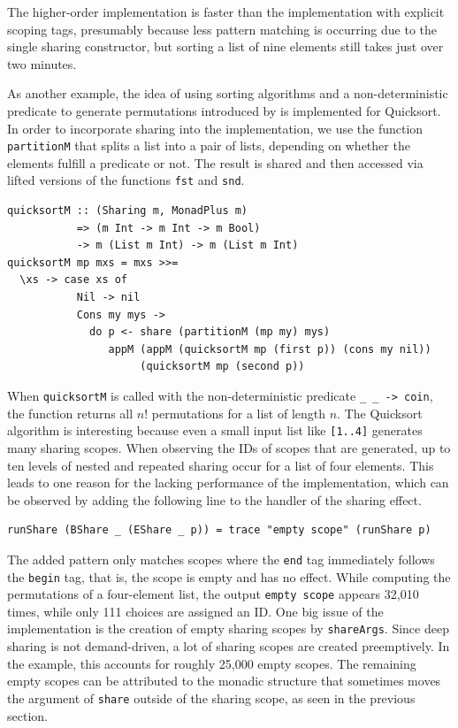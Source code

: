 \documentclass[a4paper, 11pt, fleqn, twoside, abstract=on]{scrreprt}
\newcommand{\hinl}[1]{\texttt{#1}}
\begin{document}
The higher-order implementation is faster than the implementation with explicit scoping tags, presumably because less pattern matching is occurring due to the single sharing constructor, but sorting a list of nine elements still takes just over two minutes.

As another example, the idea of using sorting algorithms and a non-deterministic predicate to generate permutations introduced by \citet{Christiansen2016allsorts} is implemented for Quicksort.
In order to incorporate sharing into the implementation, we use the function \hinl{partitionM} that splits a list into a pair of lists, depending on whether the elements fulfill a predicate or not.
The result is shared and then accessed via lifted versions of the functions \hinl{fst} and \hinl{snd}.

\begin{verbatim}
quicksortM :: (Sharing m, MonadPlus m) 
           => (m Int -> m Int -> m Bool) 
           -> m (List m Int) -> m (List m Int)
quicksortM mp mxs = mxs >>=
  \xs -> case xs of
           Nil -> nil
           Cons my mys ->
             do p <- share (partitionM (mp my) mys)
                appM (appM (quicksortM mp (first p)) (cons my nil)) 
                     (quicksortM mp (second p))
\end{verbatim}

When \hinl{quicksortM} is called with the non-deterministic predicate \hinl{\_ _ -> coin}, the function returns all $n!$ permutations for a list of length $n$.
The Quicksort algorithm is interesting because even a small input list like \hinl{[1..4]} generates many sharing scopes.
When observing the IDs of scopes that are generated, up to ten levels of nested and repeated sharing occur for a list of four elements.
This leads to one reason for the lacking performance of the implementation, which can be observed by adding the following line to the handler of the sharing effect.

\begin{verbatim}
runShare (BShare _ (EShare _ p)) = trace "empty scope" (runShare p)
\end{verbatim}

The added pattern only matches scopes where the \hinl{end} tag immediately follows the \hinl{begin} tag, that is, the scope is empty and has no effect.
While computing the permutations of a four-element list, the output \hinl{empty scope} appears 32,010 times, while only 111 choices are assigned an ID.
One big issue of the implementation is the creation of empty sharing scopes by \hinl{shareArgs}.
Since deep sharing is not demand-driven, a lot of sharing scopes are created preemptively.
In the example, this accounts for roughly 25,000 empty scopes.
The remaining empty scopes can be attributed to the monadic structure that sometimes moves the argument of \hinl{share} outside of the sharing scope, as seen in the previous section.
\end{document}
